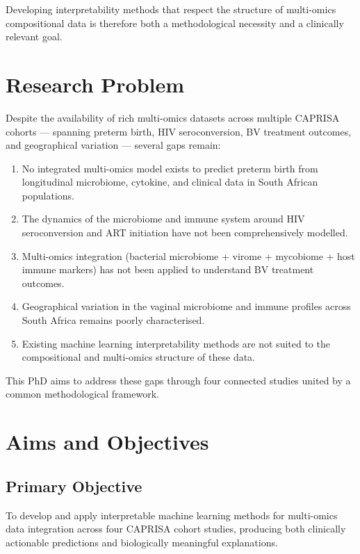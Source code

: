 \documentclass[12pt,a4paper]{report}
\begin{document}
Developing interpretability methods that respect the structure of multi-omics compositional data is therefore both a methodological necessity and a clinically relevant goal.

\section{Research Problem}

Despite the availability of rich multi-omics datasets across multiple CAPRISA cohorts --- spanning preterm birth, HIV seroconversion, BV treatment outcomes, and geographical variation --- several gaps remain:

\begin{enumerate}
    \item No integrated multi-omics model exists to predict preterm birth from longitudinal microbiome, cytokine, and clinical data in South African populations.
    \item The dynamics of the microbiome and immune system around HIV seroconversion and ART initiation have not been comprehensively modelled.
    \item Multi-omics integration (bacterial microbiome + virome + mycobiome + host immune markers) has not been applied to understand BV treatment outcomes.
    \item Geographical variation in the vaginal microbiome and immune profiles across South Africa remains poorly characterised.
    \item Existing machine learning interpretability methods are not suited to the compositional and multi-omics structure of these data.
\end{enumerate}

This PhD aims to address these gaps through four connected studies united by a common methodological framework.

\section{Aims and Objectives}

\subsection{Primary Objective}

To develop and apply interpretable machine learning methods for multi-omics data integration across four CAPRISA cohort studies, producing both clinically actionable predictions and biologically meaningful explanations.
\end{document}
